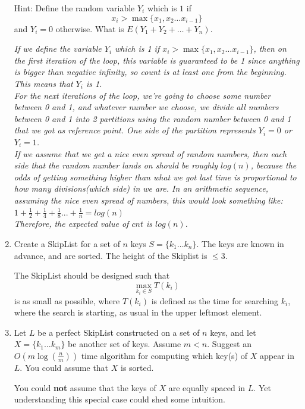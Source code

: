 \documentclass[11pt,epic,leqno,eepic,psfig,]{article}
\newcommand{\ans}[1]{{\color{brown}{\bf\Large Answer:} \sl  #1 \color{black}}}
\renewcommand{\i}{\item}
\begin{document}
\begin{enumerate}
Hint: Define the random variable $Y_i$ which is $1$ if
$$x_i > \max\{x_1, x_2\dots x_{i-1}\} $$
and $Y_i=0$ otherwise. What is
$E(Y_1+Y_2+\dots + Y_n )$.

\ans{If we define the variable $Y_i$ which is 1 if $x_i > \max\{x_1, x_2\dots x_{i-1}\} $, then on the first iteration of the loop, this variable is guaranteed to be 1 since anything is bigger than negative infinity, so count is at least one from the beginning. This means that $Y_i$ is 1.
\\ For the next iterations of the loop, we're going to choose some number between 0 and 1, and whatever number we choose, we divide all numbers between 0 and 1 into 2 partitions using the random number between 0 and 1 that we got as reference point. One side of the partition represents $Y_i = 0$ or $Y_i = 1$.
\\ If we assume that we get a nice even spread of random numbers, then each side that the random number lands on should be roughly $log(n)$, because the odds of getting something higher than what we got last time is proportional to how many divisions(which side) in we are. In an arithmetic sequence, assuming the nice even spread of numbers, this would look something like: 
\\ $1 + \frac{1}{2} + \frac{1}{4} +\frac{1}{8}...+ \frac{1}{n} = log(n)$ 
\\ Therefore, the expected value of $cnt$ is $log(n)$. }





\i  Create a SkipList for a set of $n$ keys
$S=\{k_1\dots k_n\}$.
The keys are known in advance, and are sorted. The height of the Skiplist is $\leq 3$.

The SkipList should be designed such that $$\max_{k_i\in S} T(k_i) $$ is as small as possible, where $T(k_i)$ is defined as the time for searching $k_i$, where the search is starting, as usual in the upper leftmost element.





\i Let $L$ be a perfect SkipList constructed on a set of $n$ keys, and let $X=\{k_1\dots k_m\}$ be another  set of keys. Assume $m<n$.  Suggest an $O(m\log({\frac {n }{m}}))$ time  algorithm for computing which key(s) of $X$  appear in $L$.  {\color{brown} You could assume that $X$ is sorted}.



You could {\bf not } assume that the keys of $X$ are equally spaced in $L$. Yet understanding this special case could shed some intuition.

\end{enumerate}
\end{document}
